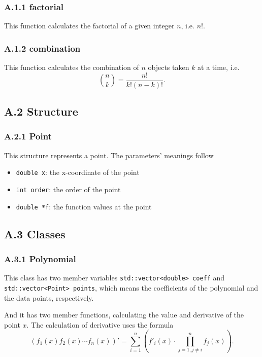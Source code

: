 \documentclass[a4paper]{article}
\begin{document}
\subsubsection*{A.1.1 factorial}

This function calculates the factorial of a given integer $n$, i.e. $n!$.

\subsubsection*{A.1.2 combination}

This function calculates the combination of $n$ objects taken $k$ at a time, i.e. 
\begin{equation}
    \binom{n}{k} = \frac{n!}{k!(n - k)!}.
    \label{eq:combination}
\end{equation}

\subsection*{A.2 Structure}

\subsubsection*{A.2.1 Point}

This structure represents a point. The parameters' meanings follow
\begin{itemize}
    \item \verb|double x|: the x-coordinate of the point
    \item \verb|int order|: the order of the point
    \item \verb|double *f|: the function values at the point
\end{itemize}

\subsection*{A.3 Classes}

\subsubsection*{A.3.1 Polynomial}

This class has two member variables \verb|std::vector<double> coeff| and \verb|std::vector<Point> points|, which means the coefficients of the polynomial and the data points, respectively.

And it has two member functions, calculating the value and derivative of the point $x$. The calculation of derivative uses the formula
\begin{equation}
    (f_1(x)f_2(x) \cdots f_n(x))' = \sum_{i = 1}^n \left(f'_i(x) \cdot \prod_{j = 1, j \neq i}^n f_j(x)\right).
    \label{eq:derivative}
\end{equation}
\end{document}
